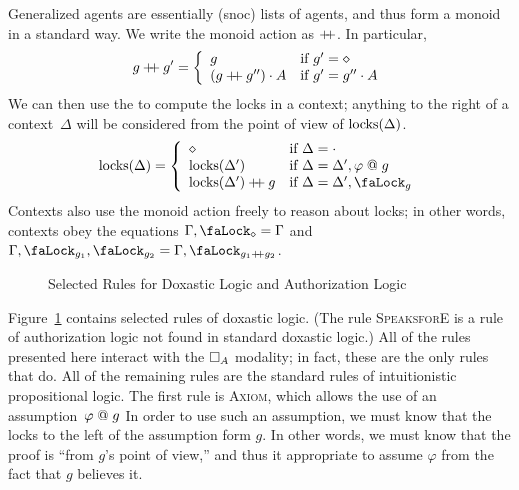 Generalized agents are essentially (snoc) lists of agents, and thus form a monoid in a standard way.
We write the monoid action as $\mathbin{+\!\!+}$.
In particular, $$g \mathbin{+\!\!+} g' = \left\{\begin{array}{ll} g & \text{if $g' = \diamond$}\\ (g \mathbin{+\!\!+} g'') \cdot A & \text{if $g' = g'' \cdot A$}\end{array}\right.$$
We can then use the to compute the locks in a context; anything to the right of a context~$\Delta$ will be considered from the point of view of $\text{locks}(\Delta)$.
$$\locks{\Delta} = \left\{\begin{array}{ll} \diamond & \text{if $\Delta = \cdot$}\\ \locks{\Delta'} & \text{if $\Delta = \Delta', \varphi \at g$}\\ \locks{\Delta'} \join g & \text{if $\Delta = \Delta', \lock_g$}\end{array}\right.$$
Contexts also use the monoid action freely to reason about locks; in other words, contexts obey the equations $\Gamma, \lock_\diamond = \Gamma$ and $\Gamma, \lock_{g_1}, \lock_{g_2} = \Gamma, \lock_{g_1 \join g_2}$.

\begin{figure}
  \centering

  
  \caption{Selected Rules for Doxastic Logic and Authorization Logic}
  \label{fig:dox-rules}
\end{figure}

Figure~\ref{fig:dox-rules} contains selected rules of doxastic logic.
(The rule \textsc{SpeaksforE} is a rule of authorization logic not found in standard doxastic logic.)
All of the rules presented here interact with the $\mathop{\square_{A}} $ modality; in fact, these are the only rules that do.
All of the remaining rules are the standard rules of intuitionistic propositional logic.
The first rule is \textsc{Axiom}, which allows the use of an assumption~$\varphi \mathrel{@} g$
In order to use such an assumption, we must know that the locks to the left of the assumption form $g$.
In other words, we must know that the proof is ``from $g$'s point of view,'' and thus it appropriate to assume $\varphi$ from the fact that $g$ believes it.

